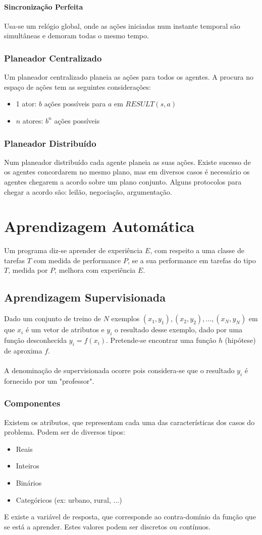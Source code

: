 \documentclass[10pt,a4paper]{report}
\begin{document}
\subsubsection{Sincronização Perfeita}
Usa-se um relógio global, onde as ações iniciadas num instante temporal são simultâneas e demoram todas o mesmo tempo.
\subsection{Planeador Centralizado}
Um planeador centralizado planeia as ações para todos os agentes. A procura no espaço de ações tem as seguintes considerações:
\begin{itemize}
\item 1 ator: $b$ ações possíveis para $a$ em $RESULT(s,a)$
\item $n$ atores: $b^n$ ações possíveis
\end{itemize}
\subsection{Planeador Distribuído}
Num planeador distribuído cada agente planeia as suas ações. Existe sucesso de os agentes concordarem no mesmo plano, mas em diversos casos é necessário os agentes chegarem a acordo sobre um plano conjunto. Alguns protocolos para chegar a acordo são: leilão, negociação, argumentação.
\chapter{Aprendizagem Automática}
Um programa diz-se aprender de experiência $E$, com respeito a uma classe de tarefas $T$ com medida de performance $P$, se a sua performance em tarefas do tipo $T$, medida por $P$, melhora com experiência $E$.
\section{Aprendizagem Supervisionada}
Dado um conjunto de treino de $N$ exemplos $(x_1,y_1), (x_2,y_2), ..., (x_N,y_N)$ em que $x_i$ é um vetor de atributos e $y_i$  o resultado desse exemplo, dado por uma função desconhecida $y_i = f(x_i)$. Pretende-se encontrar uma função $h$ (hipótese) de aproxima $f$.\\
\\
A denominação de supervisionada ocorre pois considera-se que o resultado $y_i$ é fornecido por um "professor".
\subsection{Componentes}
Existem os atributos, que representam cada uma das características dos casos do problema. Podem ser de diversos tipos:
\begin{itemize}
\item Reais
\item Inteiros
\item Binários
\item Categóricos (ex: urbano, rural, ...)
\end{itemize}
E existe a variável de resposta, que corresponde ao contra-domínio da função que se está a aprender. Estes valores podem ser discretos ou contínuos.
\end{document}

